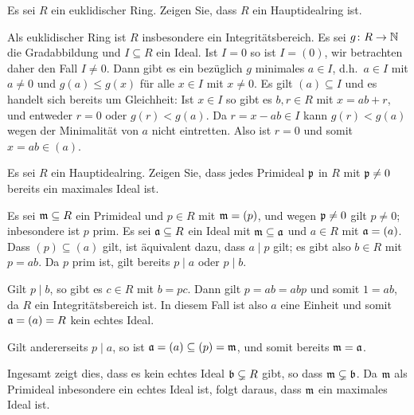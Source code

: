 \begin{question}[subtitle = Euklidische Ringe sind Hauptidealringe]
  Es sei $R$ ein euklidischer Ring.
  Zeigen Sie, dass $R$ ein Hauptidealring ist.
\end{question}


\begin{solution}
  Als euklidischer Ring ist $R$ insbesondere ein Integritätsbereich.
  Es sei $g \colon R \to \mathbb{N}$ die Gradabbildung und $I \subseteq R$ ein Ideal.
  Ist $I = 0$ so ist $I = (0)$, wir betrachten daher den Fall $I \neq 0$.
  Dann gibt es ein bezüglich $g$ minimales $a \in I$, d.h.\ $a \in I$ mit $a \neq 0$ und $g(a) \leq g(x)$ für alle $x \in I$ mit $x \neq 0$.
  Es gilt $(a) \subseteq I$ und es handelt sich bereits um Gleichheit:
  Ist $x \in I$ so gibt es $b, r \in R$ mit $x = ab + r$, und entweder $r = 0$ oder $g(r) < g(a)$.
  Da $r = x - ab \in I$ kann $g(r) < g(a)$ wegen der Minimalität von $a$ nicht eintretten.
  Also ist $r = 0$ und somit $x = ab \in (a)$.
\end{solution}


\begin{question}[subtitle = Primideale in Hauptidearingen]
  Es sei $R$ ein Hauptidealring.
  Zeigen Sie, dass jedes Primideal $\mathfrak{p}$ in $R$ mit $\mathfrak{p} \neq 0$ bereits ein maximales Ideal ist.
\end{question}


\begin{solution}
  Es sei $\mathfrak{m} \subseteq R$ ein Primideal und $p \in R$ mit $\mathfrak{m} = (p)$, und wegen $\mathfrak{p} \neq 0$ gilt $p \neq 0$;
  inbesondere ist $p$ prim.
  Es sei $\mathfrak{a} \subseteq R$ ein Ideal mit $\mathfrak{m} \subseteq \mathfrak{a}$ und $a \in R$ mit $\mathfrak{a} = (a)$.
  Dass $(p) \subseteq (a)$ gilt, ist äquivalent dazu, dass $a \mid p$ gilt;
  es gibt also $b \in R$ mit $p = ab$.
  Da $p$ prim ist, gilt bereits $p \mid a$ oder $p \mid b$.
  
  Gilt $p \mid b$, so gibt es $c \in R$ mit $b = pc$.
  Dann gilt $p = ab = abp$ und somit $1 = ab$, da $R$ ein Integritätsbereich ist.
  In diesem Fall ist also $a$ eine Einheit und somit $\mathfrak{a} = (a) = R$ kein echtes Ideal.
  
  Gilt andererseits $p \mid a$, so ist $\mathfrak{a} = (a) \subseteq (p) = \mathfrak{m}$, und somit bereits $\mathfrak{m} = \mathfrak{a}$.
  
  Ingesamt zeigt dies, dass es kein echtes Ideal $\mathfrak{b} \subsetneq R$ gibt, so dass $\mathfrak{m} \subsetneq \mathfrak{b}$.
  Da $\mathfrak{m}$ als Primideal inbesondere ein echtes Ideal ist, folgt daraus, dass $\mathfrak{m}$ ein maximales Ideal ist.
\end{solution}


